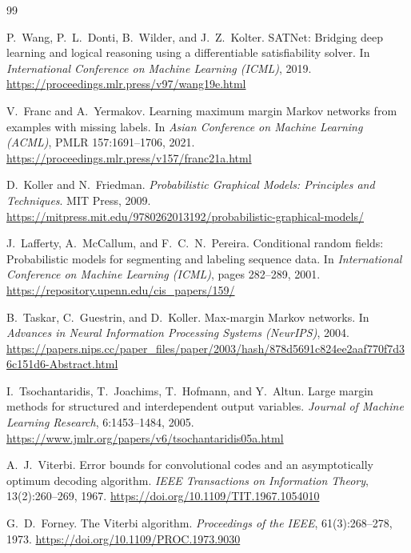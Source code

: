 \documentclass{ctuthesis}
\begin{document}
\begin{thebibliography}{99}

P.~Wang, P.~L.~Donti, B.~Wilder, and J.~Z.~Kolter.
\newblock SATNet: Bridging deep learning and logical reasoning using a
differentiable satisfiability solver.
\newblock In \emph{International Conference on Machine Learning (ICML)},
2019.
\newblock \url{https://proceedings.mlr.press/v97/wang19e.html}

V.~Franc and A.~Yermakov.
\newblock Learning maximum margin Markov networks from examples with
missing labels.
\newblock In \emph{Asian Conference on Machine Learning (ACML)},
PMLR 157:1691--1706, 2021.
\newblock \url{https://proceedings.mlr.press/v157/franc21a.html}

D.~Koller and N.~Friedman.
\newblock \emph{Probabilistic Graphical Models: Principles and Techniques}.
\newblock MIT Press, 2009.
\newblock \url{https://mitpress.mit.edu/9780262013192/probabilistic-graphical-models/}

J.~Lafferty, A.~McCallum, and F.~C.~N.~Pereira.
\newblock Conditional random fields: Probabilistic models for segmenting
and labeling sequence data.
\newblock In \emph{International Conference on Machine Learning (ICML)},
pages 282--289, 2001.
\newblock \url{https://repository.upenn.edu/cis_papers/159/}

B.~Taskar, C.~Guestrin, and D.~Koller.
\newblock Max-margin Markov networks.
\newblock In \emph{Advances in Neural Information Processing Systems
(NeurIPS)}, 2004.
\newblock \url{https://papers.nips.cc/paper_files/paper/2003/hash/878d5691c824ee2aaf770f7d36c151d6-Abstract.html}

I.~Tsochantaridis, T.~Joachims, T.~Hofmann, and Y.~Altun.
\newblock Large margin methods for structured and interdependent output
variables.
\newblock \emph{Journal of Machine Learning Research}, 6:1453--1484, 2005.
\newblock \url{https://www.jmlr.org/papers/v6/tsochantaridis05a.html}

A.~J.~Viterbi.
\newblock Error bounds for convolutional codes and an asymptotically
optimum decoding algorithm.
\newblock \emph{IEEE Transactions on Information Theory},
13(2):260--269, 1967.
\newblock \url{https://doi.org/10.1109/TIT.1967.1054010}

G.~D.~Forney.
\newblock The Viterbi algorithm.
\newblock \emph{Proceedings of the IEEE}, 61(3):268--278, 1973.
\newblock \url{https://doi.org/10.1109/PROC.1973.9030}


\end{thebibliography}
\end{document}
